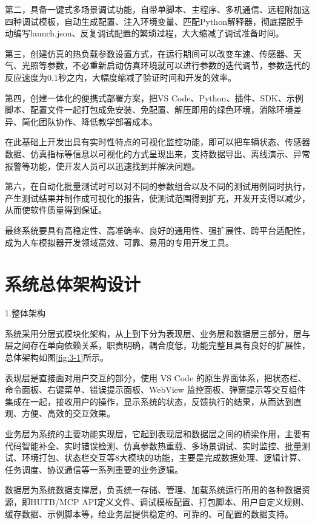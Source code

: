 第二，具备一键式多场景调试功能，自带单脚本、主程序、多机通信、远程附加这四种调试模板，自动生成配置、注入环境变量、匹配Python解释器，彻底摆脱手动编写launch.json、反复调试配置的繁琐过程，大大缩减了调试准备时间。

第三，创建仿真的热负载参数设置方式，在运行期间可以改变车速、传感器、天气、光照等参数，不必重新启动仿真环境就可以进行参数的迭代调节，参数迭代的反应速度为0.1秒之内，大幅度缩减了验证时间和开发的效率。

第四，创建一体化的便携式部署方案，把VS Code、Python、插件、SDK、示例脚本、配置文件一起打包成免安装、免配置、解压即用的绿色环境，消除环境差异、简化团队协作、降低教学部署成本。

在此基础上开发出具有实时性特点的可视化监控功能，即可以把车辆状态、传感器数据、仿真指标等信息以可视化的方式呈现出来，支持数据导出、离线演示、异常报警等功能，使开发人员可以迅速找到并解决问题。

第六，在自动化批量测试时可以对不同的参数组合以及不同的测试用例同时执行，产生测试结果并制作成可视化的报告，使测试范围得到扩充，开发开支得以减少，从而使软件质量得到保证。

最终系统要具有高稳定性、高准确率、良好的通用性、强扩展性、跨平台适配性，成为人车模拟器开发领域高效、可靠、易用的专用开发工具。

\section{系统总体架构设计}

1.整体架构

系统采用分层式模块化架构，从上到下分为表现层、业务层和数据层三部分，层与层之间存在单向依赖关系，职责明确，耦合度低，功能完整且具有良好的扩展性，总体架构如图\ref{fig:3-1}所示。

表现层是直接面对用户交互的部分，使用 VS Code
的原生界面体系，把状态栏、命令面板、右键菜单、错误提示面板、WebView
监控面板、弹窗提示等交互组件集成在一起，接收用户的操作，显示系统的状态，反馈执行的结果，从而达到直观、方便、高效的交互效果。

业务层为系统的主要功能实现层，它起到表现层和数据层之间的桥梁作用，主要有代码智能补全、实时错误检测、仿真参数热重载、多场景调试、实时监控、批量测试、环境打包、状态栏交互等8大模块的功能，主要是完成数据处理、逻辑计算、任务调度、协议通信等一系列重要的业务逻辑。

数据层为系统数据支撑层，负责统一存储、管理、加载系统运行所用的各种数据资源，即HUTB/MCP
API定义文件、调试模板配置、打包脚本、用户自定义规则、缓存数据、示例脚本等，给业务层提供稳定的、可靠的、可配置的数据支持。

